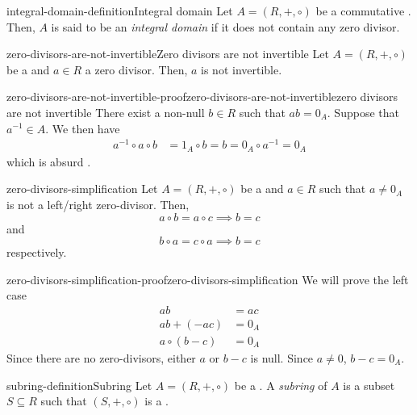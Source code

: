 \documentclass[preview]{standalone}
\begin{document}
\begin{snippetdefinition}{integral-domain-definition}{Integral domain}
    Let \(A = (R, +, \circ)\) be a commutative \ring.
    Then, \(A\) is said to be an \emph{integral domain}
    if it does not contain any zero divisor.
\end{snippetdefinition}

\begin{snippetproposition}{zero-divisors-are-not-invertible}{Zero divisors are not invertible}
    Let \(A = (R, +, \circ)\) be a \ring and \(a \in R\)
    a zero divisor. Then, \(a\) is not invertible.
\end{snippetproposition}

\begin{snippetproof}{zero-divisors-are-not-invertible-proof}{zero-divisors-are-not-invertible}{zero divisors are not invertible}
    There exist a non-null \(b \in R\) such that \(ab = 0_A\).
    Suppose that \(a^{-1} \in A\). We then have
    \begin{align*}
        a^{-1} \circ a \circ b &= 1_A \circ b = b = 0_A \circ a^{-1} = 0_A
    \end{align*}
    which is absurd \lightning.
\end{snippetproof}

\begin{snippetproposition}{zero-divisors-simplification}{}
    Let \(A = (R, +, \circ)\) be a \ring and \(a \in R\)
    such that \(a\neq 0_A\) is not a left/right zero-divisor. Then,
    \[
        a \circ b = a \circ c \implies b = c
    \]
    and
    \[
        b \circ a = c \circ a \implies b = c
    \]
    respectively.
\end{snippetproposition}

\begin{snippetproof}{zero-divisors-simplification-proof}{zero-divisors-simplification}{}
    We will prove the left case
    \begin{align*}
        ab &= ac \\
        ab + (-ac) &= 0_A \\
        a\circ (b-c) &= 0_A
    \end{align*}
    Since there are no zero-divisors, either \(a\) or \(b-c\) is null.
    Since \(a \neq 0\), \(b-c = 0_A\).
\end{snippetproof}

\begin{snippetdefinition}{subring-definition}{Subring}
    Let \(A = (R, +, \circ)\) be a \ring.
    A \emph{subring} of \(A\) is a subset \(S \subseteq R\)
    such that \((S, +, \circ)\) is a \ring.
\end{snippetdefinition}
\end{document}
